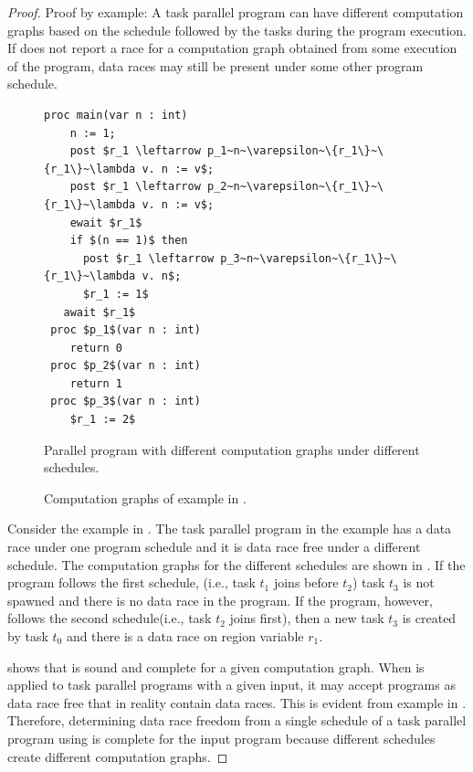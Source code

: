 \begin{proof}
Proof by example: A task parallel program can have different computation graphs based on the schedule followed by the tasks during the program execution. If  does not report a race for a computation graph obtained from some execution of the program, data races may still be present under some other program schedule. 

\begin{figure}
  \begin{center}
    \begin{lstlisting}[mathescape=true]
  proc main(var n : int)
  	n := 1;
  	post $r_1 \leftarrow p_1~n~\varepsilon~\{r_1\}~\{r_1\}~\lambda v. n := v$;
  	post $r_1 \leftarrow p_2~n~\varepsilon~\{r_1\}~\{r_1\}~\lambda v. n := v$;
  	ewait $r_1$ 
  	if $(n == 1)$ then
      post $r_1 \leftarrow p_3~n~\varepsilon~\{r_1\}~\{r_1\}~\lambda v. n$;
      $r_1 := 1$
   await $r_1$
 proc $p_1$(var n : int)
 	return 0
 proc $p_2$(var n : int)
	return 1
 proc $p_3$(var n : int)
	$r_1 := 2$
\end{lstlisting}
  \end{center}
  \caption{Parallel program with different computation graphs under different schedules.}
  \label{fig:diffCGs}
\end{figure}

\begin{figure}
  \centering
  \caption{Computation graphs of example in .}
   \label{fig:diffCGsfig}
\end{figure}

Consider the example in . The task parallel program in the example has a data race under one program schedule and it is data race free under a different schedule. The computation graphs for the different schedules are shown in . If the program follows the first schedule, (i.e., task $t_1$ joins before $t_2$) task $t_3$ is not spawned and there is no data race in the program. If the program, however, follows the second schedule(i.e., task $t_2$ joins first), then a new task $t_3$ is created by task $t_0$ and there is a data race on region variable $r_1$. 

 shows that  is sound and complete for a given computation graph. When  is applied to task parallel programs with a given input, it may accept programs as data race free that in reality contain data races. This is evident from example in . Therefore, determining data race freedom from a single schedule of a task parallel program using  is complete for the input program because different schedules create different computation graphs. 


\end{proof}
